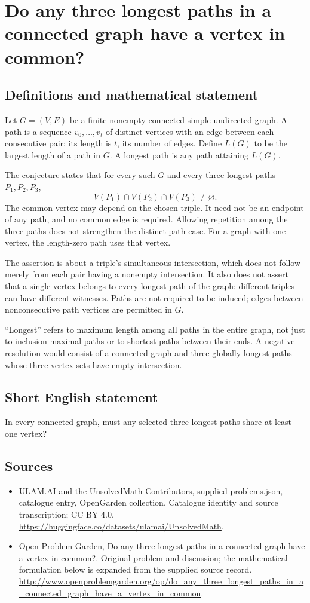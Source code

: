 \documentclass[11pt,a4paper]{article}
\begin{document}
\section*{Do any three longest paths in a connected graph have a vertex in common?}\label{statement}

\subsection{Definitions and mathematical statement}
Let $G=(V,E)$ be a finite nonempty connected simple undirected graph.
A path is a sequence $v_0,\ldots,v_t$ of distinct vertices with an edge
between each consecutive pair; its length is $t$, its number of edges.
Define $L(G)$ to be the largest length of a path in $G$.
A longest path is any path attaining $L(G)$.

The conjecture states that for every such $G$ and every three longest
paths $P_1,P_2,P_3$,
\[
 V(P_1)\cap V(P_2)\cap V(P_3)\ne\varnothing.
\]
The common vertex may depend on the chosen triple. It need not be an
endpoint of any path, and no common edge is required. Allowing repetition
among the three paths does not strengthen the distinct-path case.
For a graph with one vertex, the length-zero path uses that vertex.

The assertion is about a triple's simultaneous intersection, which does
not follow merely from each pair having a nonempty intersection. It also
does not assert that a single vertex belongs to every longest path of
the graph: different triples can have different witnesses. Paths are
not required to be induced; edges between nonconsecutive path vertices
are permitted in $G$.

``Longest'' refers to maximum length among all paths in the entire graph,
not just to inclusion-maximal paths or to shortest paths between their
ends. A negative resolution would consist of a connected graph and
three globally longest paths whose three vertex sets have empty
intersection.
\subsection{Short English statement}
In every connected graph, must any selected three longest paths share at least one vertex?
\subsection{Sources}
\begin{itemize}
\item[S1] ULAM.AI and the UnsolvedMath Contributors, supplied problems.json, catalogue entry, OpenGarden collection. Catalogue identity and source transcription; CC BY 4.0.
\url{https://huggingface.co/datasets/ulamai/UnsolvedMath}.
\item[S2] Open Problem Garden, Do any three longest paths in a connected graph have a vertex in common?. Original problem and discussion; the mathematical formulation below is expanded from the supplied source record.
\url{http://www.openproblemgarden.org/op/do_any_three_longest_paths_in_a_connected_graph_have_a_vertex_in_common}.
\end{itemize}
\end{document}
